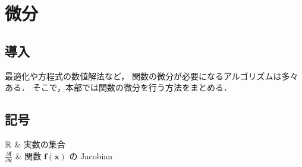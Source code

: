 %

\part{微分}

\chapter{導入}

最適化や方程式の数値解法など，
関数の微分が必要になるアルゴリズムは多々ある．
そこで，本部では関数の微分を行う方法をまとめる．

\chapter{記号}

\begin{explainlist}
    $\mathbb{R}$ & 実数の集合 \\
    $\frac{\partial \bm{f}}{\partial \bm{x}}$ & 関数 $\bm{f}(\bm{x})$ の Jacobian \\
\end{explainlist}


